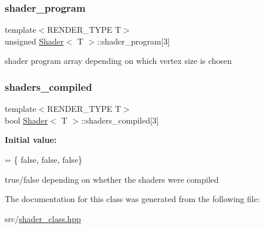 \subsubsection{\texorpdfstring{shader\+\_\+program}{shader\_program}}
{\footnotesize\ttfamily template$<$R\+E\+N\+D\+E\+R\+\_\+\+T\+Y\+PE T$>$ \\
unsigned \mbox{\hyperlink{classShader}{Shader}}$<$ T $>$\+::shader\+\_\+program\mbox{[}3\mbox{]}\hspace{0.3cm}{\ttfamily [protected]}}

shader program array depending on which vertex size is chosen \mbox{\label{classShader_a057162ea090f838f7fbb658cb301efc4}} 
\subsubsection{\texorpdfstring{shaders\+\_\+compiled}{shaders\_compiled}}
{\footnotesize\ttfamily template$<$R\+E\+N\+D\+E\+R\+\_\+\+T\+Y\+PE T$>$ \\
bool \mbox{\hyperlink{classShader}{Shader}}$<$ T $>$\+::shaders\+\_\+compiled\mbox{[}3\mbox{]}\hspace{0.3cm}{\ttfamily [protected]}}

{\bfseries Initial value\+:}
\begin{DoxyCode}
= \{
        \textcolor{keyword}{false}, \textcolor{keyword}{false},
        \textcolor{keyword}{false}\}
\end{DoxyCode}
true/false depending on whether the shaders were compiled 

The documentation for this class was generated from the following file\+:\begin{DoxyCompactItemize}
\item 
src/\mbox{\hyperlink{shader__class_8hpp}{shader\+\_\+class.\+hpp}}\end{DoxyCompactItemize}
